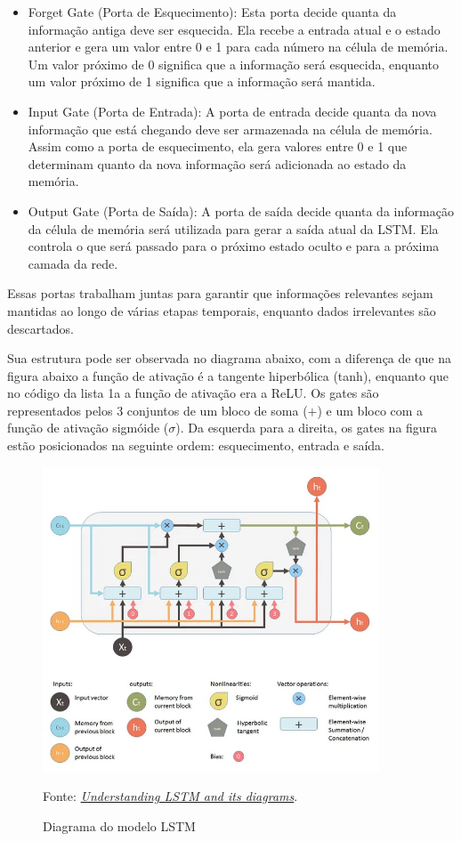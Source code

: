 \documentclass[12 pt]{article}
\begin{document}
\begin{itemize}
    \item Forget Gate (Porta de Esquecimento): Esta porta decide quanta da informação antiga deve ser esquecida. Ela recebe a entrada atual e o estado anterior e gera um valor entre 0 e 1 para cada número na célula de memória. Um valor próximo de 0 significa que a informação será esquecida, enquanto um valor próximo de 1 significa que a informação será mantida.
    \item Input Gate (Porta de Entrada): A porta de entrada decide quanta da nova informação que está chegando deve ser armazenada na célula de memória. Assim como a porta de esquecimento, ela gera valores entre 0 e 1 que determinam quanto da nova informação será adicionada ao estado da memória.
    \item Output Gate (Porta de Saída): A porta de saída decide quanta da informação da célula de memória será utilizada para gerar a saída atual da LSTM. Ela controla o que será passado para o próximo estado oculto e para a próxima camada da rede.
\end{itemize}

Essas portas trabalham juntas para garantir que informações relevantes sejam mantidas ao longo de várias etapas temporais, enquanto dados irrelevantes são descartados.

Sua estrutura pode ser observada no diagrama abaixo, com a diferença de que na figura abaixo a função de ativação é a tangente hiperbólica (tanh), enquanto que no código da lista 1a a função de ativação era a ReLU. Os gates são representados pelos 3 conjuntos de um bloco de soma ($+$) e um bloco com a função de ativação sigmóide ($\sigma$). Da esquerda para a direita, os gates na figura estão posicionados na seguinte ordem: esquecimento, entrada e saída. 

\begin{figure}[H]
    \caption{Diagrama do modelo LSTM}
    \centering
    \includegraphics[width=10cm]{LSTM.jpg}
    \small

    Fonte: \href{https://blog.mlreview.com/understanding-lstm-and-its-diagrams-37e2f46f1714}{\textit{Understanding LSTM and its diagrams}}.
\end{figure}
\end{document}
